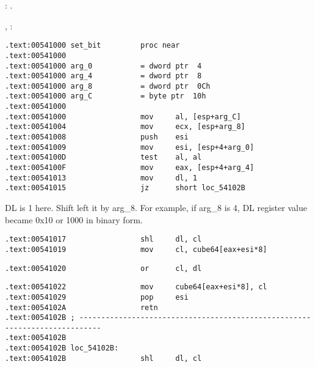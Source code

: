 : .

, :

\begin{lstlisting}
.text:00541000 set_bit         proc near
.text:00541000
.text:00541000 arg_0           = dword ptr  4
.text:00541000 arg_4           = dword ptr  8
.text:00541000 arg_8           = dword ptr  0Ch
.text:00541000 arg_C           = byte ptr  10h
.text:00541000
.text:00541000                 mov     al, [esp+arg_C]
.text:00541004                 mov     ecx, [esp+arg_8]
.text:00541008                 push    esi
.text:00541009                 mov     esi, [esp+4+arg_0]
.text:0054100D                 test    al, al
.text:0054100F                 mov     eax, [esp+4+arg_4]
.text:00541013                 mov     dl, 1
.text:00541015                 jz      short loc_54102B
\end{lstlisting}

{DL is 1 here. Shift left it by arg\_8. For example, if arg\_8 is 4, DL register value became 
0x10 or 1000 in binary form.}

\begin{lstlisting}
.text:00541017                 shl     dl, cl
.text:00541019                 mov     cl, cube64[eax+esi*8]
\end{lstlisting}


\begin{lstlisting}
.text:00541020                 or      cl, dl
\end{lstlisting}


\begin{lstlisting}
.text:00541022                 mov     cube64[eax+esi*8], cl
.text:00541029                 pop     esi
.text:0054102A                 retn
.text:0054102B ; ---------------------------------------------------------------------------
.text:0054102B
.text:0054102B loc_54102B:
.text:0054102B                 shl     dl, cl
\end{lstlisting}

